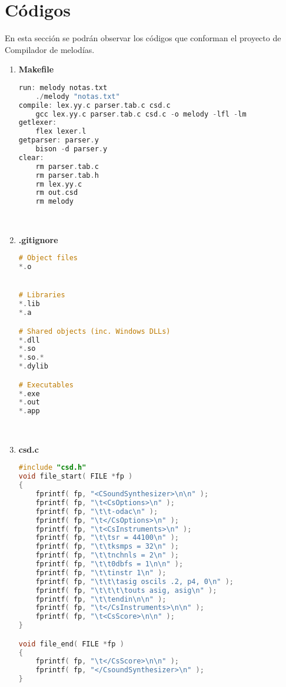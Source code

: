 \documentclass[12pt]{article}
\begin{document}
\section{Códigos}
En esta sección se podrán observar los códigos que conforman el proyecto de Compilador de melodías.

\begin{enumerate}

\item {\bf Makefile}\\
\begin{lstlisting}[language=C]
run: melody notas.txt
	./melody "notas.txt"
compile: lex.yy.c parser.tab.c csd.c
	gcc lex.yy.c parser.tab.c csd.c -o melody -lfl -lm
getlexer:
	flex lexer.l
getparser: parser.y
	bison -d parser.y
clear:
	rm parser.tab.c
	rm parser.tab.h
	rm lex.yy.c
	rm out.csd
	rm melody
\end{lstlisting}\\

\item {\bf .gitignore}\\
\begin{lstlisting}[language=C]
# Object files
*.o


# Libraries
*.lib
*.a

# Shared objects (inc. Windows DLLs)
*.dll
*.so
*.so.*
*.dylib

# Executables
*.exe
*.out
*.app
\end{lstlisting}\\

\item {\bf csd.c}\\
\begin{lstlisting}[language=C]
#include "csd.h"
void file_start( FILE *fp )
{
	fprintf( fp, "<CSoundSynthesizer>\n\n" );
	fprintf( fp, "\t<CsOptions>\n" );
	fprintf( fp, "\t\t-odac\n" );
	fprintf( fp, "\t</CsOptions>\n" );
	fprintf( fp, "\t<CsInstruments>\n" );
	fprintf( fp, "\t\tsr = 44100\n" );
	fprintf( fp, "\t\tksmps = 32\n" );
	fprintf( fp, "\t\tnchnls = 2\n" );
	fprintf( fp, "\t\t0dbfs = 1\n\n" );
	fprintf( fp, "\t\tinstr 1\n" );
	fprintf( fp, "\t\t\tasig oscils .2, p4, 0\n" );
	fprintf( fp, "\t\t\t\touts asig, asig\n" );
	fprintf( fp, "\t\tendin\n\n" );
	fprintf( fp, "\t</CsInstruments>\n\n" );
	fprintf( fp, "\t<CsScore>\n\n" );
}

void file_end( FILE *fp )
{
	fprintf( fp, "\t</CsScore>\n\n" );
	fprintf( fp, "</CsoundSynthesizer>\n" );
}


\end{lstlisting}
\end{enumerate}
\end{document}

